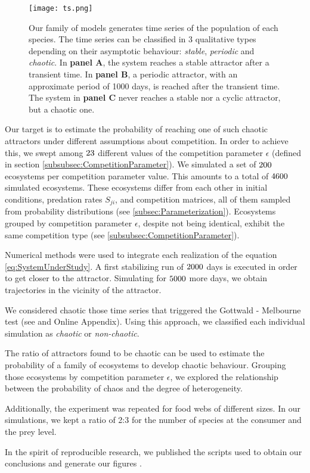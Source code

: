 \begin{figure}
	\begin{center}
		\texttt{[image: ts.png]}
	\end{center}
	\caption{Our family of models generates time series of the population of each species. The time series can be classified in $3$ qualitative types depending on their asymptotic behaviour: \textit{stable}, \textit{periodic} and \textit{chaotic}. In \textbf{panel A}, the system reaches a stable attractor after a transient time. In \textbf{panel B}, a periodic attractor, with an approximate period of 1000 days, is reached after the transient time. The system in \textbf{panel C} never reaches a stable nor a cyclic attractor, but a chaotic one.}
	\label{fig:TimeSeries}
\end{figure}

Our target is to estimate the probability of reaching one of such chaotic attractors under different assumptions about competition. In order to achieve this, we swept among $23$ different values of the competition parameter $\epsilon$ (defined in section \ref{subsubsec:CompetitionParameter}). We simulated a set of $200$ ecosystems per competition parameter value. This amounts to a total of $4600$ simulated ecosystems. These ecosystems differ from each other in initial conditions, predation rates $S_{ji}$, and competition matrices, all of them sampled from probability distributions (see \ref{subsec:Parameterization}). Ecosystems grouped by competition parameter $\epsilon$, despite not being identical, exhibit the same competition type (see \ref{subsubsec:CompetitionParameter}).

Numerical methods were used to integrate each realization of the equation \ref{eq:SystemUnderStudy}. A first stabilizing run of $ 2000 $ days is executed in order to get closer to the attractor. Simulating for $ 5000 $ more days, we obtain trajectories in the vicinity of the attractor.

We considered chaotic those time series that triggered the Gottwald - Melbourne test (see\cite{Gottwald2009} and Online Appendix). Using this approach, we classified each individual simulation as \textit{chaotic} or \textit{non-chaotic}.

The ratio of attractors found to be chaotic can be used to estimate the probability of a family of ecosystems to develop chaotic behaviour. Grouping those ecosystems by competition parameter $\epsilon$, we explored the relationship between the probability of chaos and the degree of heterogeneity.

Additionally, the experiment was repeated for food webs of different sizes. In our simulations, we kept a ratio of 2:3 for the number of species at the consumer and the prey level.

In the spirit of reproducible research, we published the scripts used to obtain our conclusions and generate our figures \cite{Rodriguez-Sanchez-code-neuchaos}.